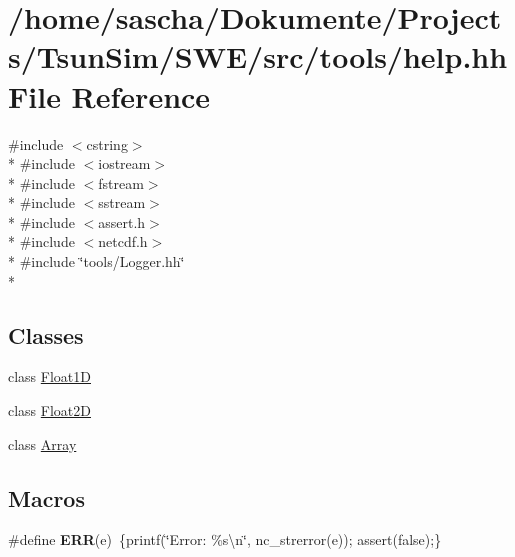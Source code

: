 \hypertarget{help_8hh}{\section{/home/sascha/\-Dokumente/\-Projects/\-Tsun\-Sim/\-S\-W\-E/src/tools/help.hh File Reference}
\label{help_8hh}
}
{\ttfamily \#include $<$cstring$>$}\\*
{\ttfamily \#include $<$iostream$>$}\\*
{\ttfamily \#include $<$fstream$>$}\\*
{\ttfamily \#include $<$sstream$>$}\\*
{\ttfamily \#include $<$assert.\-h$>$}\\*
{\ttfamily \#include $<$netcdf.\-h$>$}\\*
{\ttfamily \#include \char`\"{}tools/\-Logger.\-hh\char`\"{}}\\*
\subsection*{Classes}
\begin{DoxyCompactItemize}
\item 
class \hyperlink{classFloat1D}{Float1\-D}
\item 
class \hyperlink{classFloat2D}{Float2\-D}
\item 
class \hyperlink{classArray}{Array}
\end{DoxyCompactItemize}
\subsection*{Macros}
\begin{DoxyCompactItemize}
\item 
\hypertarget{help_8hh_a588357de2986fdf4c1380190f7ae9f37}{\#define {\bfseries E\-R\-R}(e)~\{printf(\char`\"{}Error\-: \%s\textbackslash{}n\char`\"{}, nc\-\_\-strerror(e)); assert(false);\}}\label{help_8hh_a588357de2986fdf4c1380190f7ae9f37}

\end{DoxyCompactItemize}
